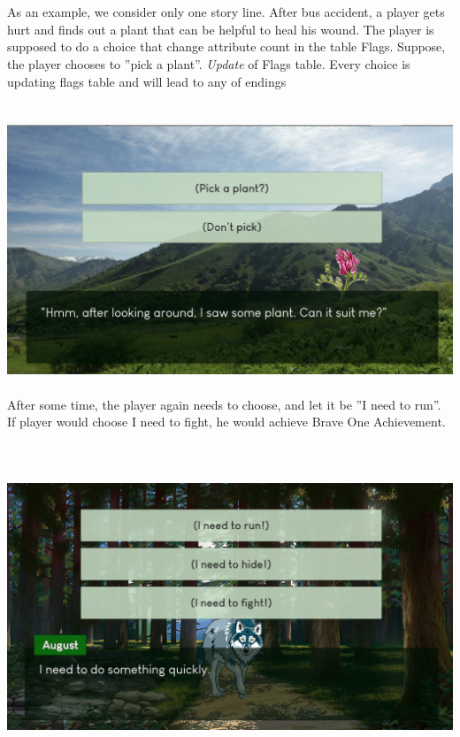 \documentclass[12pt,a4paper]{article}
\newcommand{\ind}{\indent\indent}
\begin{document}
\ind\\ \ind\\
As an example, we consider only one story line. After bus accident, a player gets hurt and finds out a plant that can be helpful to heal his wound. The player is supposed to do a choice that change attribute count in the table Flags. Suppose, the player chooses to ''pick a plant''. \textit{Update} of Flags table. Every choice is updating flags table and will lead to any of endings  \\
\ind\\ \ind\\
\includegraphics[scale=0.35]{images/1}
\ind\\ \ind\\
After some time, the player again needs to choose, and let it be ''I need to run''. If player would choose I need to fight, he would achieve Brave One Achievement.\\
\\
\ind\\ \ind\\
\includegraphics[scale=0.35]{images/2}
\ind\\ \ind\\
\end{document}
